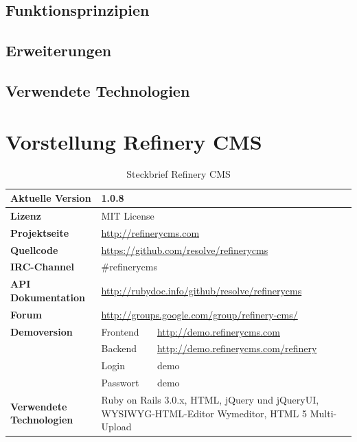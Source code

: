 \subsection{Funktionsprinzipien}
\subsection{Erweiterungen}
\subsection{Verwendete Technologien}

\newpage
\section{Vorstellung Refinery CMS}
\begin{table}
\caption{Steckbrief Refinery CMS}
\begin{tabular}[!ht]{|l|l|l|}
\hline
\textbf{Aktuelle Version} & \multicolumn{2}{p{10cm}|}{1.0.8} \\
\hline
\textbf{Lizenz} & \multicolumn{2}{p{10cm}|}{MIT License} \\
\hline
\textbf{Projektseite} & \multicolumn{2}{p{10cm}|}{\href{http://refinerycms.com}{http://refinerycms.com}} \\
\hline
\textbf{Quellcode} & \multicolumn{2}{p{10cm}|}{\href{https://github.com/resolve/refinerycms}{https://github.com/resolve/refinerycms}} \\
\hline
\textbf{IRC-Channel} & \multicolumn{2}{p{10cm}|}{\#refinerycms} \\
\hline
\textbf{API Dokumentation} & \multicolumn{2}{p{10cm}|}{\href{http://rubydoc.info/github/resolve/refinerycms}{http://rubydoc.info/github/resolve/refinerycms}} \\
\hline
\textbf{Forum} & \multicolumn{2}{p{10cm}|}{\href{http://groups.google.com/group/refinery-cms/}{http://groups.google.com/group/refinery-cms/}} \\
\hline
\textbf{Demoversion} & Frontend & \href{http://demo.refinerycms.com}{http://demo.refinerycms.com} \\
\cline{2-3}
& Backend & \href{http://demo.refinerycms.com/refinery}{http://demo.refinerycms.com/refinery} \\
\cline{2-3}
& Login & demo \\
\cline{2-3}
& Passwort & demo \\
\hline
\textbf{Verwendete Technologien} & \multicolumn{2}{p{10cm}|}{Ruby on Rails 3.0.x, HTML, jQuery und jQueryUI, WYSIWYG-HTML-Editor Wymeditor, HTML 5 Multi-Upload} \\

\end{tabular}
\end{table}

